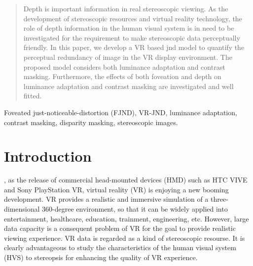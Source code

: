 \documentclass[journal]{IEEEtran}
\begin{document}



\maketitle

\begin{abstract}
Depth is important information in real stereoscopic viewing. As the development of stereoscopic resources and virtual reality technology, the role of depth information in the human visual system is in need to be investigated for the requirement to make stereoscopic data perceptually friendly. In this paper, we develop a VR based jnd model to quantify the perceptual redundancy of image in the VR display environment. The proposed model considers both luminance adaptation and contrast masking. Furthermore, the effects of both foveation and depth on luminance adaptation and contrast masking are investigated and well fitted.
\end{abstract}

\begin{IEEEkeywords}
Foveated just-noticeable-distortion (FJND), VR-JND, luminance adaptation, contrast masking, disparity masking, stereoscopic images.
\end{IEEEkeywords}


\IEEEpeerreviewmaketitle

\section{Introduction}
, as the release of commercial head-mounted devices (HMD) such as HTC VIVE and Sony PlayStation VR, virtual reality (VR) is enjoying a new booming development. VR provides a realistic and immersive simulation of a three-dimensional 360-degree environment, so that it can be widely applied into entertainment, healthcare, education, trainment, engineering, etc. However, large data capacity is a consequent problem of VR for the goal to provide realistic viewing experience. VR data is regarded as a kind of stereoscopic resourse. It is clearly advantageous to study the characteristics of the human visual system (HVS) to stereopsis for enhancing the quality of VR experience.
\end{document}
